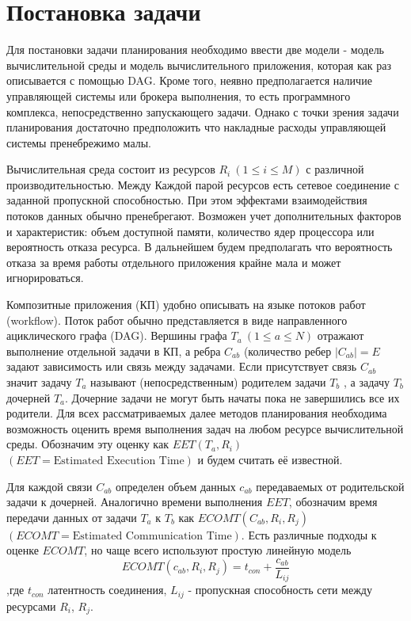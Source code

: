 \chapter*{Постановка задачи}
\begin{spacing}{1.4}

Для постановки задачи планирования необходимо ввести две модели - модель вычислительной среды и модель вычислительного приложения, которая как раз описывается с помощью DAG. Кроме того, неявно предполагается наличие управляющей системы или брокера выполнения, то есть программного комплекса, непосредственно запускающего задачи. Однако с точки зрения задачи планирования достаточно предположить что накладные расходы управляющей системы пренебрежимо малы.

Вычислительная среда состоит из ресурсов $R_i~(1 \leq i \leq M)$ с различной производительностью. Между Каждой парой ресурсов есть сетевое соединение с заданной пропускной способностью. При этом эффектами взаимодействия потоков данных обычно пренебрегают. Возможен учет дополнительных факторов и характеристик: объем доступной памяти, количество ядер процессора или вероятность отказа ресурса. В дальнейшем будем предполагать что вероятность отказа  за время работы отдельного приложения крайне мала и может игнорироваться.


Композитные приложения (КП) удобно описывать на языке потоков работ (workflow). Поток работ обычно представляется в виде направленного ациклического графа (DAG). Вершины графа $T_a~(1 \leq a \leq N) $ отражают  выполнение отдельной задачи в КП, а ребра $C_{ab}$ (количество ребер $|C_{ab}| = E$ задают зависимость или связь между задачами. Если присутствует связь $C_{ab}$ значит задачу  $T_a$ называют (непосредственным) родителем задачи  $T_b$ , а задачу $T_b$ дочерней   $T_a$. Дочерние задачи не могут быть начаты пока не завершились все их родители. Для всех рассматриваемых далее методов планирования необходима возможность оценить время выполнения задач на любом ресурсе вычислительной среды. Обозначим эту оценку как $EET(T_a, R_i)$ $(EET = \text{Estimated Execution Time})$ и будем считать её известной. 

Для каждой связи $C_{ab}$ определен объем данных $c_{ab}$ передаваемых от родительской задачи к дочерней. Аналогично времени выполнения $EET$, обозначим время передачи данных от задачи $T_a$ к $T_b$ как $ECOMT(C_{ab}, R_i, R_j)$ $(ECOMT = \text{Estimated Communication Time})$. Есть различные подходы к оценке $ECOMT$, но чаще всего используют простую линейную модель $$ECOMT (c_{ab}, R_i, R_j) = t_{con} + \frac{c_{ab}}{L_{ij}}$$
,где $t_{con}$ латентность соединения, $L_{ij}$ - пропускная способность сети между ресурсами $R_i$, $R_j$. 


\end{spacing}
